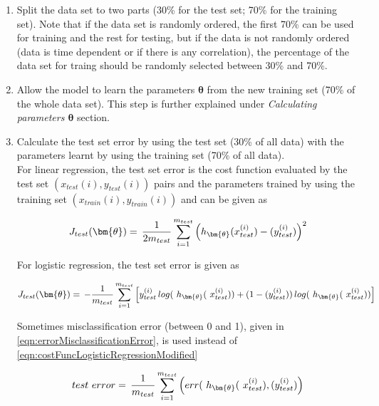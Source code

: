  \begin{enumerate}
 
  \item Split the data set to two parts (30\% for the test set; 70\% for the training set). 
  Note that if the data set is randomly ordered, the first 70\% can be used for training and the rest for testing, but if the data is not randomly ordered (data is time dependent or if there is any correlation), the percentage of the data set for traing should be randomly selected between 30\% and 70\%. %
  
  \item Allow the model to learn the parameters $\bm{\theta}$ from the new training set (70\% of the whole data set). This step is further explained under \emph{Calculating parameters ${\bm{\theta}}$} section.

  \item Calculate the test set error by using the test set (30\% of all data) with the parameters learnt by using the training set (70\% of all data).\\
  For linear regression, the test set error is the cost function evaluated by the test set $(x_{test}(i), y_{test}(i))$ pairs and the parameters trained by using the training set $(x_{train}(i), y_{train}(i))$ and can be given as
	
	\begin{equation}{\label{eqn:costFuncTest}}
	J_{test}({\bm{\theta}})
	=\,
	\frac{1}{2m_{test}} \sum\limits_{i=1}^{m_{test}} \Big(h_{\bm{\theta}}(x_{test}^{(i)}) - (y_{test}^{(i)})\Big)^2  
	\end{equation} 
	
	For logistic regression, the test set error is given as
	
	\begin{equation}{\label{eqn:costFuncLogisticRegressionModified}}
	J_{test}({\bm{\theta}})
	=\,
	-\frac{1}{m_{test}} \sum\limits_{i=1}^{m_{test}} \Big[y_{test}^{(i)}\,log(\ h_{\bm{\theta}}(\ x_{test}^{(i)})) + (1-(y_{test}^{(i)}))\,log(\ h_{\bm{\theta}}(\ x_{test}^{(i)}))\Big]
	\end{equation} 
	
	Sometimes misclassification error (between 0 and 1), given in \ref{eqn:errorMisclassificationError}, is used instead of \ref{eqn:costFuncLogisticRegressionModified}

	\begin{equation}{\label{eqn:errorMisclassificationError}}
	 test\ error
	=\,
	\frac{1}{m_{test}} \sum\limits_{i=1}^{m_{test}} \Big(err(\ h_{\bm{\theta}}(\ x_{test}^{(i)}), (y_{test}^{(i)})\Big)  
	\end{equation}
	

\end{enumerate}
